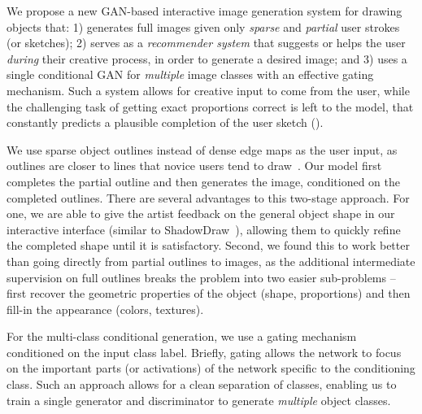 We propose a new GAN-based interactive image generation system for drawing objects that: 1) generates full images given only {\em sparse} and {\em partial} user strokes (or sketches); 2) serves as a \emph{recommender system} that suggests or helps the user \emph{during} their creative process, in order to generate a desired image; and 3) uses a single conditional GAN for {\em multiple} image classes with an effective gating mechanism. Such a system allows for creative input to come from the user, while the challenging task of getting exact proportions correct is left to the model, that constantly predicts a plausible completion of the user sketch (). %

We use sparse object outlines instead of dense edge maps as the user input, as outlines are closer to lines that novice users tend to draw~\cite{cole2008people}. 
Our model first completes the partial outline and then generates the image, conditioned on the completed outlines. 
There are several advantages to this two-stage approach.
For one, we are able to give the artist feedback on the general object shape in our interactive interface (similar to ShadowDraw~\cite{lee2011shadowdraw}), allowing them to quickly refine the completed shape until it is satisfactory.
Second, we found this to work better than going directly from partial outlines to images, as the additional intermediate supervision on full outlines breaks the problem into two easier sub-problems -- first recover the geometric properties of the object (shape, proportions) and then fill-in the appearance (colors, textures). 



For the multi-class conditional generation, we use a gating mechanism conditioned on the input class label. Briefly, gating allows the network to focus on the important parts (or activations) of the network specific to the conditioning class. Such an approach allows for a clean separation of classes, enabling us to train a single generator and discriminator to  generate \emph{multiple} object classes. %

